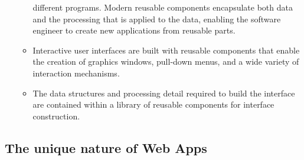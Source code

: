 \documentclass{article}
\begin{document}
\begin{enumerate}[label=\arabic*.]
\begin{itemize}
				different programs.
				Modern reusable components encapsulate both data and the processing that is applied to the
				data, enabling the software engineer to create new applications from reusable parts.
			\item Interactive user interfaces are built with reusable components that enable the creation of
				graphics windows, pull-down menus, and a wide variety of interaction mechanisms.
			\item The data structures and processing detail required to build the interface are contained within
				a library of reusable components for interface construction.
		\end{itemize}
	\end{enumerate} \newpage

	\subsection{The unique nature of Web Apps}
\end{document}
